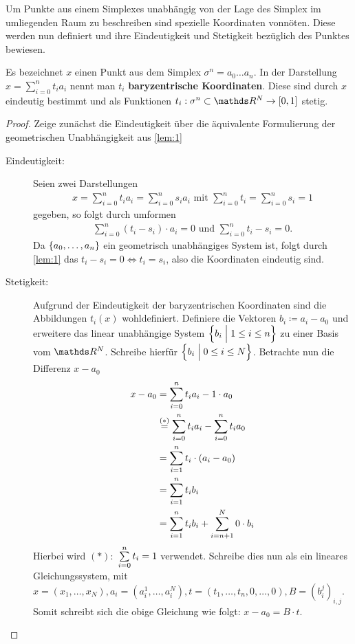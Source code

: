 Um Punkte aus einem Simplexes unabhängig von der Lage des Simplex im
umliegenden Raum zu beschreiben sind spezielle Koordinaten
vonnöten. Diese werden nun definiert und ihre Eindeutigkeit und
Stetigkeit bezüglich des Punktes bewiesen.


\begin{Lem}\label{lem:bary}
  \normalfont Es bezeichnet $x$ einen Punkt aus dem Simplex
  $\sigma^n = a_0\ldots a_n$. In der Darstellung
  $x = \sum_{i=0}^n t_i a_i$ nennt man $t_i$ \textbf{baryzentrische
    Koordinaten}. Diese sind durch $x$ eindeutig bestimmt und als
  Funktionen $t_i : \sigma^n \subset \R^N \rightarrow [0,1]$ stetig.
  \begin{proof}
    Zeige zunächst die Eindeutigkeit über die äquivalente
    Formulierung der geometrischen Unabhängigkeit aus \cref{lem:1}
    \begin{description}
    \item[Eindeutigkeit: ] Seien zwei Darstellungen
      \begin{gather*}
        x = \sum\limits_{i=0}^n t_i a_i = \sum\limits_{i=0}^n s_i a_i
        \text{ mit } \sum\limits_{i=0}^n t_i = \sum\limits_{i=0}^n s_i
        = 1
      \end{gather*}
      gegeben, so folgt durch umformen
      \begin{gather*}
        \sum\limits_{i=0}^n (t_i - s_i ) \cdot a_i = 0 \text{ und }
        \sum\limits_{i=0}^n t_i - s_i = 0.
      \end{gather*}
      Da $\sset{a_0 , \ldots , a_n}$ ein geometrisch unabhängiges
      System ist, folgt durch \cref{lem:1} das
      $t_i - s_i = 0 \Leftrightarrow t_i = s_i$, also die Koordinaten
      eindeutig sind.
    \item[Stetigkeit: ] Aufgrund der Eindeutigkeit der baryzentrischen
      Koordinaten sind die Abbildungen $t_i (x)$ wohldefiniert.
      Definiere die Vektoren $b_i \coloneqq a_i - a_0$ und erweitere
      das linear unabhängige System $\set{ b_i }{ 1 \leq i \leq n}$ zu
      einer Basis vom $\R^N$. Schreibe hierfür $\set{ b_i
      }{ 0 \leq i \leq N}$. Betrachte nun die Differenz $x - a_0$
      \begin{align*}
        x - a_0 &= \sp{0}{n} t_i a_i - 1 \cdot a_0\\
                &\overset{(*)}{=} \sp{0}{n} t_i a_i - \sp{0}{n} t_i a_0\\
                &= \sp{1}{n} t_i \cdot (a_i - a_0)\\
                &= \sp{1}{n} t_i b_i\\
                &= \sp{1}{n} t_i b_i + \sp{n+1}{N} 0 \cdot b_i
      \end{align*}
      Hierbei wird $(*):$ $\sp{0}{n} t_i = 1$ verwendet. Schreibe dies
      nun als ein lineares Gleichungssystem, mit
      $x=(x_1,\ldots,x_N),a_i=(a_i^1,\ldots,a_i^N),%
      t=(t_1,\ldots,t_n,0,\ldots,0),B=(b_i^j)_{i,j}$.
      Somit schreibt sich die obige Gleichung wie folgt:
      $x-a_0 = B\cdot t$.
     

\end{description}
\end{proof}
\end{Lem}
